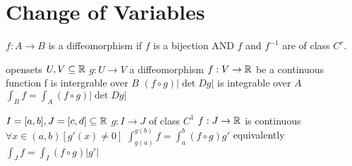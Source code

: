 \section{Change of Variables}

 

$f: A\to B$ is a diffeomorphism if
$f$ is a bijection AND $f$ and $f^{-1}$ are of class $C^r$.


 
\begin{tTheorem}
\tLET
opensets $U, V \subseteq {\mathbb R}$\newline
$g: U\to V$ a diffeomorphism\newline
$f:V\to {\mathbb R}$ be a continuous function
\tTHEN f is intergrable over $B$\newline
  \IFF $(f\circ g)|\det D g|$ is integrable over $A$
\tNOTE $\int_B f = \int_A(f\circ g)|\det D g|$
\end{tTheorem}

 
\begin{tTheorem}
\tLET
$I=[a,b], J=[c,d]\subseteq{\mathbb R}$\newline
$g:I\to J$ of class $C^1$\newline
$f:J\to {\mathbb R}$ is continuous
\tIF $\forall x\in(a,b) \left[g'(x)\neq 0\right]$
\tTHEN $\int^{g(b)}_{g(a)}f=\int^b_a (f\circ g)g'$\newline
equivalently $\int_J f=\int_I (f\circ g)|g'|$
\end{tTheorem}